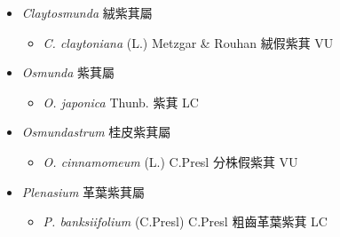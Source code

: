 
  \begin{itemize}
 \item[] \textit{Claytosmunda} 絨紫萁屬
                                
  \begin{itemize}
        \item[] \textit{C. claytoniana} (L.) Metzgar \& Rouhan  絨假紫萁   VU
  \end{itemize}
 \item[] \textit{Osmunda} 紫萁屬
                                
  \begin{itemize}
        \item[] \textit{O. japonica} Thunb.  紫萁   LC
  \end{itemize}
 \item[] \textit{Osmundastrum} 桂皮紫萁屬
                                
  \begin{itemize}
        \item[] \textit{O. cinnamomeum} (L.) C.Presl  分株假紫萁   VU
  \end{itemize}
 \item[] \textit{Plenasium} 革葉紫萁屬
                                
  \begin{itemize}
        \item[] \textit{P. banksiifolium} (C.Presl) C.Presl  粗齒革葉紫萁   LC
  \end{itemize}
  \end{itemize}
